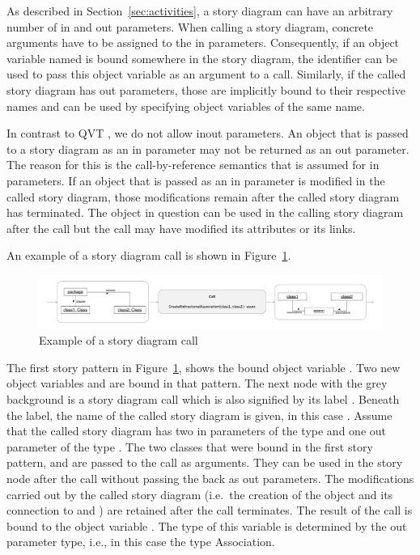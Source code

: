 As described in Section~\ref{sec:activities}, a story diagram can have an arbitrary number of in and out parameters. When calling a story diagram, concrete arguments have to be assigned to the in parameters. Consequently, if an object variable named  is bound somewhere in the story diagram, the identifier  can be used to pass this object variable as an argument to a call. Similarly, if the called story diagram has out parameters, those are implicitly bound to their respective names and can be used by specifying object variables of the same name.

In contrast to QVT \cite{QVT}, we do not allow inout parameters. An object that is passed to a story diagram as an in parameter may not be returned as an out parameter.
The reason for this is the call-by-reference semantics that is assumed for in parameters. If an object that is passed as an in parameter is modified in the called story diagram, those modifications remain after the called story diagram has terminated. The object in question can be used in the calling story diagram after the call but the call may have modified its attributes or its links.

An example of a story diagram call is shown in Figure~\ref{fig:call}.

\begin{figure}[htb]
\begin{center}
  \includegraphics[width=\textwidth]{figures/StoryDiagramCall}
  \caption{Example of a story diagram call}
  \label{fig:call}
\end{center}
\end{figure}

The first story pattern in Figure~\ref{fig:call}, shows the bound object variable . Two new object variables  and  are bound in that pattern. The next node with the grey background is a story diagram call which is also signified by its label . Beneath the label, the name of the called story diagram is given, in this case . Assume that the called story diagram has two in parameters of the type  and one out parameter of the type . The two classes that were bound in the first story pattern,  and  are passed to the call as arguments. They can be used in the story node after the call without passing the back as out parameters. The modifications carried out by the called story diagram (i.e.\ the creation of the  object and its connection to  and ) are retained after the call terminates.
The result of the call is bound to the object variable . The type of this variable is determined by the out parameter type, i.e., in this case the type Association.

